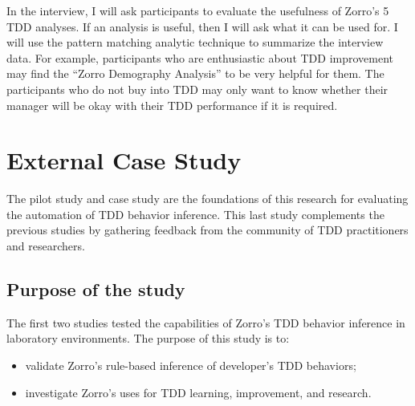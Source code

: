In the interview, I will ask participants to evaluate the usefulness
of Zorro's 5 TDD analyses. If an analysis is useful, then I will ask
what it can be used for. I will use the pattern matching analytic
technique to summarize the interview data. For example, participants
who are enthusiastic about TDD improvement may find the ``Zorro
Demography Analysis'' to be very helpful for them. The participants
who do not buy into TDD may only want to know whether their manager
will be okay with their TDD performance if it is required.

\section{External Case Study}
The pilot study and case study are the foundations of this research
for evaluating the automation of TDD behavior inference. This last study 
complements the previous studies by gathering feedback from the 
community of TDD practitioners and researchers.

\subsection{Purpose of the study} 
The first two studies tested the capabilities of Zorro's TDD behavior
inference in laboratory environments.  The
purpose of this study is to:
\begin{itemize}
\item validate Zorro's rule-based inference of developer's TDD behaviors;
\item investigate Zorro's uses for TDD learning, improvement, and research.
\end{itemize}

